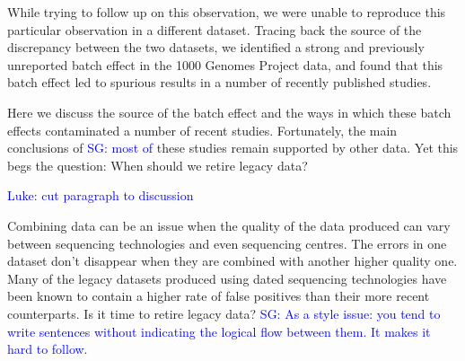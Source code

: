 \documentclass[9pt,lineno]{elife}
\newcommand{\sgcomment}[1]{\textcolor{blue}{SG: #1}}
\newcommand{\luke}[1]{\textcolor{blue}{Luke: #1}}
\begin{document}
While trying to follow up on this observation, we were unable to reproduce this particular observation in a different dataset. Tracing back the source of the discrepancy between the two datasets, we identified a strong and previously unreported batch effect in the 1000 Genomes Project data, and found that this batch effect led to spurious results in a number of recently published studies. 

Here we discuss the source of the batch effect and the ways in which these batch effects contaminated a number of recent studies. Fortunately, the main conclusions of \sgcomment{most of} these studies remain supported by other data.  Yet this begs the question: When should we retire legacy data?














\luke{cut paragraph to discussion}

Combining data can be an issue when the quality of the data produced can vary between sequencing technologies and even sequencing centres.
The errors in one dataset don't disappear when they are combined with another higher quality one. 
Many of the legacy datasets produced using dated sequencing technologies have been known to contain a higher rate of false positives than their more recent counterparts.
Is it time to retire legacy data? 
\sgcomment{As a style issue: you tend to write sentences without indicating the logical flow between them. It makes it hard to follow. }

	
\end{document}
